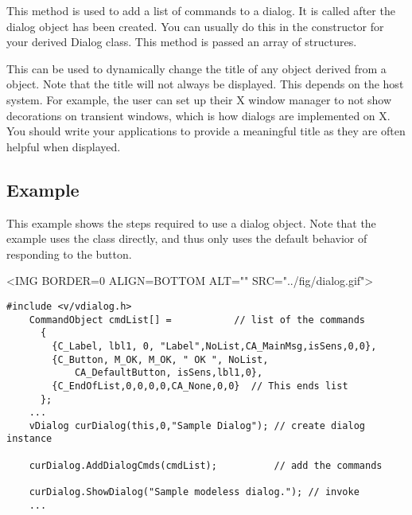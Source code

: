 This method is used to add a list of commands to a dialog.
It is called after the dialog object has been created.
You can usually do this in the constructor for your
derived Dialog class. This method is passed an array
of  structures.
    

This can be used to dynamically change the title of any object
derived from a  object. Note that the title will
not always be displayed. This depends on the host system. For
example, the user can set up their X window manager to not show
decorations on transient windows, which is how dialogs
are implemented on X. You should write your applications to
provide a meaningful title as they are often helpful when
displayed.

\subsection* {Example}

This example shows the steps required to use a dialog object.
Note that the example uses the  class directly,
and thus only uses the default behavior of responding to the
 button.
    
\vspace{.1in}
\small
\begin{rawhtml}
<IMG BORDER=0 ALIGN=BOTTOM ALT="" SRC="../fig/dialog.gif">
\end{rawhtml}
\begin{latexonly}

\end{latexonly}
\normalfont\normalsize

\footnotesize
\begin{verbatim}
#include <v/vdialog.h>
    CommandObject cmdList[] =           // list of the commands
      {
        {C_Label, lbl1, 0, "Label",NoList,CA_MainMsg,isSens,0,0},
        {C_Button, M_OK, M_OK, " OK ", NoList,
            CA_DefaultButton, isSens,lbl1,0},
        {C_EndOfList,0,0,0,0,CA_None,0,0}  // This ends list
      };
    ...
    vDialog curDialog(this,0,"Sample Dialog"); // create dialog instance

    curDialog.AddDialogCmds(cmdList);          // add the commands

    curDialog.ShowDialog("Sample modeless dialog."); // invoke
    ...

\end{verbatim}
\normalfont\normalsize

